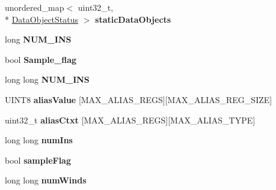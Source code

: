 \begin{DoxyCompactItemize}
\item 
\hypertarget{structRedSpyThreadData_a31b9779ab16ab0f2acdc278b7c7da115}{unordered\-\_\-map$<$ uint32\-\_\-t, \\*
\hyperlink{structdataObjectStatus}{Data\-Object\-Status} $>$ {\bfseries static\-Data\-Objects}}\label{structRedSpyThreadData_a31b9779ab16ab0f2acdc278b7c7da115}

\item 
\hypertarget{structRedSpyThreadData_a157b4d14268002f9d89f7f9311735670}{long {\bfseries N\-U\-M\-\_\-\-I\-N\-S}}\label{structRedSpyThreadData_a157b4d14268002f9d89f7f9311735670}

\item 
\hypertarget{structRedSpyThreadData_afbe6c4e6ac0277cbc56c880227526130}{bool {\bfseries Sample\-\_\-flag}}\label{structRedSpyThreadData_afbe6c4e6ac0277cbc56c880227526130}

\item 
\hypertarget{structRedSpyThreadData_a29b8d3af1306eec0067cbaccecbb4bdc}{long long {\bfseries N\-U\-M\-\_\-\-I\-N\-S}}\label{structRedSpyThreadData_a29b8d3af1306eec0067cbaccecbb4bdc}

\item 
\hypertarget{structRedSpyThreadData_acca3b70257441e9fe959130f89bf4dba}{U\-I\-N\-T8 {\bfseries alias\-Value} \mbox{[}M\-A\-X\-\_\-\-A\-L\-I\-A\-S\-\_\-\-R\-E\-G\-S\mbox{]}\mbox{[}M\-A\-X\-\_\-\-A\-L\-I\-A\-S\-\_\-\-R\-E\-G\-\_\-\-S\-I\-Z\-E\mbox{]}}\label{structRedSpyThreadData_acca3b70257441e9fe959130f89bf4dba}

\item 
\hypertarget{structRedSpyThreadData_a63f183fbec6697e3decec969fa2e52ba}{uint32\-\_\-t {\bfseries alias\-Ctxt} \mbox{[}M\-A\-X\-\_\-\-A\-L\-I\-A\-S\-\_\-\-R\-E\-G\-S\mbox{]}\mbox{[}M\-A\-X\-\_\-\-A\-L\-I\-A\-S\-\_\-\-T\-Y\-P\-E\mbox{]}}\label{structRedSpyThreadData_a63f183fbec6697e3decec969fa2e52ba}

\item 
\hypertarget{structRedSpyThreadData_a7c145dff1ab89352606c4c186318d66d}{long long {\bfseries num\-Ins}}\label{structRedSpyThreadData_a7c145dff1ab89352606c4c186318d66d}

\item 
\hypertarget{structRedSpyThreadData_afbdc939b2e4c466b34334582e06a8419}{bool {\bfseries sample\-Flag}}\label{structRedSpyThreadData_afbdc939b2e4c466b34334582e06a8419}

\item 
\hypertarget{structRedSpyThreadData_adbbfce2296d193cbf99d26a356c73a63}{long long {\bfseries num\-Winds}}\label{structRedSpyThreadData_adbbfce2296d193cbf99d26a356c73a63}

\end{DoxyCompactItemize}



